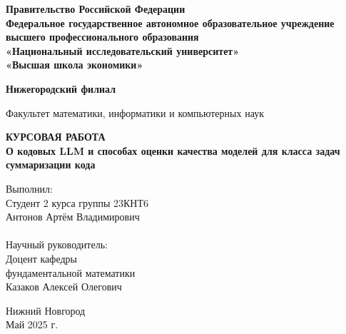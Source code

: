 \documentclass[14pt]{article}
\theoremstyle{definition}
\begin{document}
\begin{titlepage}
  \begin{center}
    \normalsize
   \textbf {Правительство Российской Федерации\\ 
Федеральное государственное автономное образовательное учреждение\\
   высшего профессионального образования\\
    «Национальный исследовательский университет» \\
     «Высшая школа экономики»}
   

    
    
    
    \textbf {Нижегородский филиал}
    
  \vfill
    Факультет математики, информатики и компьютерных наук\\
    
    
   
    \vfill

    \textbf{ КУРСОВАЯ РАБОТА}\\[5mm]
    
    {\normalsize  \textbf{О кодовых LLM и способах оценки качества моделей для класса задач
суммаризации кода}}
    
  \bigskip
    
    
\end{center}
\vfill

\newlength{\ML}
\hfill
\begin{minipage}{0.5\textwidth}
  Выполнил:\\
 Студент 2 курса группы 23КНТ6    
   \\
 Антонов Артём Владимирович\\ 


 \\Научный руководитель:\\
 Доцент кафедры\\ 
 фундаментальной математики\\
Казаков Алексей  Олегович\\
  \vspace{1cm}
 {\hspace{2.5cm}}
\end{minipage}%
\vfill

\begin{center}
  Нижний Новгород\\Май 2025 г.
\end{center}

\end{titlepage}
\end{document}
